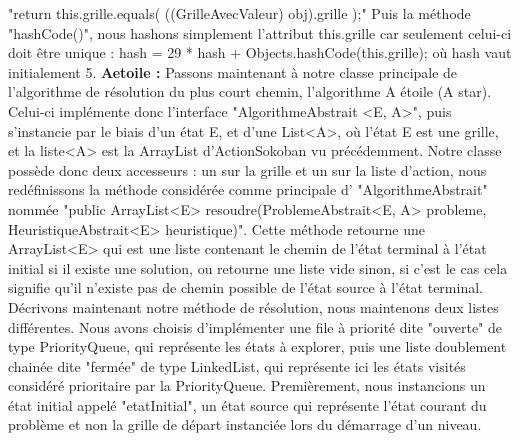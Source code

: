 \documentclass[a4paper,12pt]{article} %
\begin{document}
\newline\newline    
"return this.grille.equals( ((GrilleAvecValeur) obj).grille );"
\newline\newline
Puis la méthode "hashCode()", nous hashons simplement l’attribut this.grille car seulement celui-ci doit être unique : hash = 29 * hash + Objects.hashCode(this.grille); où hash vaut initialement 5.
\newpage
\noindent
\textbf{Aetoile :}
\newline\newline
Passons maintenant à notre classe principale de l’algorithme de résolution du plus court chemin, l’algorithme A étoile (A star).
\newline\newline
Celui-ci implémente donc l’interface "AlgorithmeAbstrait <E, A>", puis s’instancie par le biais d’un état E, et d’une List<A>, où l’état E est une grille, et la liste<A> est la ArrayList d’ActionSokoban vu précédemment.
\newline\newline 
Notre classe possède donc deux accesseurs : un sur la grille et un sur la liste d’action, nous redéfinissons la méthode considérée comme principale d’ "AlgorithmeAbstrait" nommée 
\newline\newline
"public ArrayList<E> resoudre(ProblemeAbstrait<E, A> probleme, HeuristiqueAbstrait<E> heuristique)".
\newline\newline
Cette méthode retourne une ArrayList<E> qui est une liste contenant le chemin de l'état terminal à l'état initial si il existe une solution, ou retourne une liste vide sinon, si c'est le cas cela signifie qu’il n’existe pas de chemin possible de l'état source à l’état terminal.
\newline\newline
Décrivons maintenant notre méthode de résolution, nous maintenons deux listes différentes.
\newline\newline
Nous avons choisis d’implémenter une file à priorité dite "ouverte" de type PriorityQueue, qui représente les états à explorer, puis une liste doublement chainée dite "fermée" de type LinkedList, qui représente ici les états visités considéré prioritaire par la PriorityQueue.
\newline\newline
Premièrement, nous instancions un état initial appelé "etatInitial", un état source qui représente l’état courant du problème et non la grille de départ instanciée lors du démarrage d’un niveau. 
\end{document}
